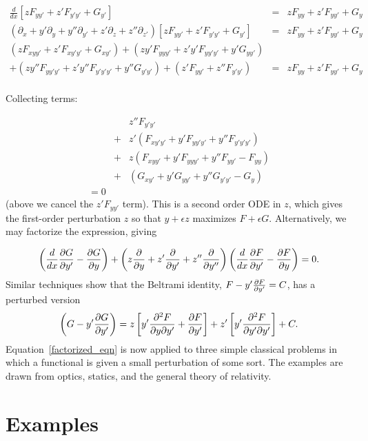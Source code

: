 \documentclass[pdflatex,sn-mathphys-num]{sn-jnl}%
\theoremstyle{thmstyleone}%
\theoremstyle{thmstyletwo}%
\theoremstyle{thmstylethree}%
\begin{document}
\begin{eqnarray}
\frac{d}{dx}\left[zF_{yy'} + z'F_{y'y'} + G_{y'}\right]
&=& zF_{yy} + z'F_{yy'} + G_{y}\nonumber\\
\left(\partial_{x} + y'\partial_{y} + y''\partial_{y'} + z'\partial_{z} + z''\partial_{z'}\right)
\left[zF_{yy'} + z'F_{y'y'} + G_{y'}\right]
&=& zF_{yy} + z'F_{yy'} + G_{y}\nonumber\\
(zF_{xyy'} + z'F_{xy'y'} + G_{xy'})
+ (zy'F_{yyy'} + z'y'F_{yy'y'} + y'G_{yy'})\nonumber\\
+ ( zy''F_{yy'y'} + z'y''F_{y'y'y'} + y''G_{y'y'})
+ (z'F_{yy'} + z''F_{y'y'})
&=& zF_{yy} + z'F_{yy'} + G_{y}\nonumber\\
\end{eqnarray}

Collecting terms:

\begin{eqnarray}
&{}& z''F_{y'y'}\nonumber\\
&+& z'(F_{xy'y'} + y'F_{yy'y'} + y''F_{y'y'y'})\nonumber\\
&+& z (F_{xyy'} + y'F_{yyy'} + y''F_{yy'}-F_{yy})\nonumber\\
&+& (G_{xy'} + y'G_{yy'} + y''G_{y'y'}- G_{y})\nonumber\\
= 0
\end{eqnarray}
%
(above we cancel the $z'F_{yy'}$ term). This is a second order ODE in
$z$, which gives the first-order perturbation $z$ so that $y+\epsilon
z$ maximizes $F+\epsilon G$.  Alternatively, we may factorize the
expression, giving

\begin{equation}\label{factorized_eqn}
\left(\frac{d}{dx}\frac{\partial{G}}{\partial{y'}} - \frac{\partial{G}}{\partial{y}}\right) + \left(z\frac{\partial{}}{\partial{y}} + z'\frac{\partial{}}{\partial{y'}} + z''\frac{\partial{}}{\partial{y''}}\right)
\left(\frac{d}{dx}\frac{\partial{F}}{\partial{y'}} - \frac{\partial{F}}{\partial{y}}\right)=0.
\end{equation}
%
Similar techniques show that the Beltrami identity,
$F-y'\frac{\partial{F}}{\partial{y'}}=C$, has a perturbed version
%
\begin{equation}\label{beltrami}
  \left(G-y'\frac{\partial{G}}{\partial{y'}}\right)
  =
    z \left[y'\frac{\partial^2F}{\partial y\partial y'} + \frac{\partial{F}}{\partial{y'}}\right]
  + z'\left[y'\frac{\partial^2F}{\partial y'\partial y'}\right] + C.
\end{equation}
%
Equation~\ref{factorized_eqn} is now applied to three simple classical
problems in which a functional is given a small perturbation of some
sort.  The examples are drawn from optics, statics, and the general
theory of relativity.

\section{Examples}
\end{document}
